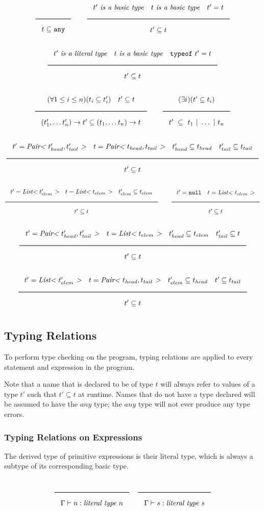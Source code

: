 \noindent
\[
\Rule{}{t \subseteq \Any}
\qquad
\Rule{t'\ \textit{is a basic type} \quad t\ \textit{is a basic type} \quad t' = t}{t' \subseteq t}
\]
\noindent
\[
\Rule{t'\ \textit{is a literal type} \quad t\ \textit{is a basic type} \quad \texttt{typeof}\ t' = t}{t' \subseteq t}
\]
\noindent
\[
\Rule{(\forall 1 \leq i \leq n)(t_i \subseteq t'_i) \quad t' \subseteq t}{(t'_1, \ldots t'_n) \rightarrow t' \subseteq (t_1, \ldots t_n) \rightarrow t}
\qquad
\Rule{(\exists i)(t' \subseteq t_i)}{t'\ \subseteq\ t_1\ |\ \ldots\ |\ t_n}
\]
\noindent
\[
\Rule{t' = \textit{Pair<}\ t'_{head}, t'_{tail}\ \textit{>} \quad t = \textit{Pair<}\ t_{head}, t_{tail}\ \textit{>}
  \quad t'_{head} \subseteq t_{head} \quad t'_{tail} \subseteq t_{tail}}{t' \subseteq t}
\]
\noindent
\[
\Rule{t' = \textit{List<}\ t'_{elem}\ \textit{>} \quad t = \textit{List<}\ t_{elem}\ \textit{>}
  \quad t'_{elem} \subseteq t_{elem}}{t' \subseteq t}
\qquad
\Rule{t' = \Null \quad t = \textit{List<}\ t_{elem}\ \textit{>}}{t' \subseteq t}
\]
\noindent
\[
\Rule{t' = \textit{Pair<}\ t'_{head}, t'_{tail}\ \textit{>} \quad t = \textit{List<}\ t_{elem}\ \textit{>}
  \quad t'_{head} \subseteq t_{elem} \quad t'_{tail} \subseteq t}{t' \subseteq t}
\]
\noindent
\[
\Rule{t' = \textit{List<}\ t'_{elem}\ \textit{>} \quad t = \textit{Pair<}\ t_{head}, t_{tail}\ \textit{>}
  \quad t'_{elem} \subseteq t_{head} \quad t' \subseteq t_{tail}}{t' \subseteq t}
\]
\noindent

\subsection{Typing Relations}

To perform type checking on the program, typing relations are applied to every statement and expression in the program.

Note that a name that is declared to be of type $t$ will always refer to values of a type $t'$ such that $t' \subseteq t$ at runtime.
Names that do not have a type declared will be assumed to have the $any$ type; the $any$ type will not ever produce any type errors.

\subsubsection{Typing Relations on Expressions}

The derived type of primitive expressions is their literal type, which is always a subtype of its corresponding basic type.

\noindent
\[
  \Rule{}{\Gamma \vdash n : \textit{literal type}\ n}
  \quad
  \Rule{}{\Gamma \vdash s : \textit{literal type}\ s}
\]
\noindent

